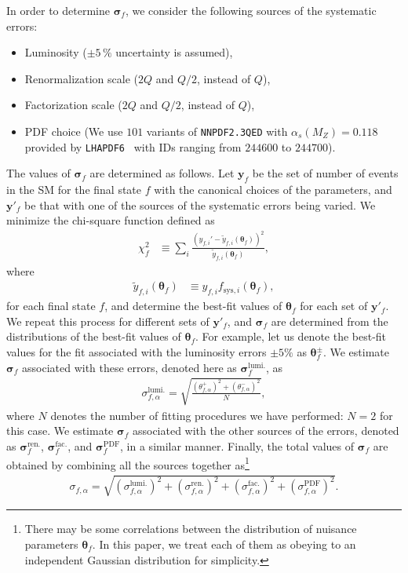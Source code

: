 \documentclass[12pt, a4paper]{article}
\begin{document}
In order to determine $\bm{\sigma}_f$,
we consider the following sources of the systematic errors:
\begin{itemize}
 \item Luminosity ($\pm 5\,\%$ uncertainty is assumed),
 \item Renormalization scale ($2Q$ and $Q/2$, instead of $Q$),
 \item Factorization scale ($2Q$ and $Q/2$, instead of $Q$),
 \item PDF choice (We use $101$ variants of \texttt{NNPDF2.3QED} with
       $\alpha_s (M_Z) = 0.118$~\cite{Ball:2013hta} provided by
       \texttt{LHAPDF6}~\cite{Buckley:2014ana} with IDs ranging from
       $244600$ to $244700$).
\end{itemize}
The values of $\bm{\sigma}_f$ are determined as follows.  Let
$\bm{y}_f$ be the set of number of events in the SM for the final
state $f$ with the canonical choices of the parameters, and
$\bm{y}'_f$ be that with one of the sources of the systematic errors being
varied.  We minimize the chi-square function defined as
\begin{align}
 \chi^2_f &\equiv \sum_i \frac
 {\left( y_{f,i}' - \tilde{y}_{f,i} (\bm{\theta}_f) \right)^2}
 {\tilde{y}_{f,i} (\bm{\theta}_f)},
\end{align}
where
\begin{align}
 \tilde{y}_{f,i} (\bm{\theta}_f) &\equiv
 y_{f,i} f_{\mathrm{sys},i} (\bm{\theta}_f),
\end{align}
for each final state $f$, and determine the best-fit values of
$\bm{\theta}_f$ for each set of $\bm{y}'_f$.  We repeat this process for
different sets of $\bm{y}'_f$, and $\bm{\sigma}_f$ are determined from
the distributions of the best-fit values of $\bm{\theta}_f$.  For
example, let us denote the best-fit values for the fit associated with
the luminosity errors $\pm 5\%$ as $\bm{\theta}_f^{\pm}$.
We estimate $\bm{\sigma}_f$ associated with these errors, denoted here as
$\bm{\sigma}_f^{\mathrm{lumi.}}$, as
\begin{align}
 \sigma_{f,\alpha}^{\mathrm{lumi.}} = \sqrt{\frac{(\theta_{f,\alpha}^{+})^2 + (\theta_{f,\alpha}^{-})^2}{N}},
\end{align}
where $N$ denotes the number of fitting procedures we have performed:
$N=2$ for this case.
We estimate $\bm{\sigma}_f$ associated with
the other sources of the errors, denoted as
$\bm{\sigma}_f^{\mathrm{ren.}}$, $\bm{\sigma}_f^{\mathrm{fac.}}$, and
$\bm{\sigma}_f^{\mathrm{PDF}}$, in a similar manner.
Finally, the total values of $\bm{\sigma}_f$ are obtained by combining all the
sources together as\footnote{
There may be some correlations between the distribution of nuisance
parameters $\bm{\theta}_{f}$.  In this paper, we treat each of them as
obeying to an independent Gaussian distribution for simplicity.
}
\begin{align}
    \sigma_{f,\alpha} = \sqrt{(\sigma_{f,\alpha}^{\mathrm{lumi.}})^2
    + (\sigma_{f,\alpha}^{\mathrm{ren.}})^2
    + (\sigma_{f,\alpha}^{\mathrm{fac.}})^2
    + (\sigma_{f,\alpha}^{\mathrm{PDF}})^2}.
    \label{eq_comb_sig}
\end{align}
\end{document}
